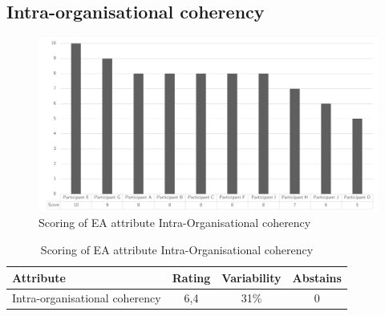 \subsection{Intra-organisational coherency}
\begin{figure}[H]
	\centering
	\includegraphics[width=0.9\linewidth]{images/scoreeaintraorganisationalcoherency}
	\caption[Scoring of EA attribute Intra-Organisational coherency]{Scoring of EA attribute Intra-Organisational coherency}
	\label{fig:appscoringeaintraorganisationalcoherency}
\end{figure}
\begin{table}[H]
	\centering
	\begin{tabular}{p{}ccc}
		\toprule
		\textbf{Attribute} & \textbf{Rating} & \textbf{Variability} & \textbf{Abstains} \\
		\midrule
		Intra-organisational coherency & 6,4 & 31\% & 0 \\%
		\bottomrule
	\end{tabular}%
	\caption[Scoring of EA attribute Intra-Organisational coherency]{Scoring of EA attribute Intra-Organisational coherency}
	\label{tab:appscoringeaintraorganisationalcoherency}%
\end{table}%
\newpage
